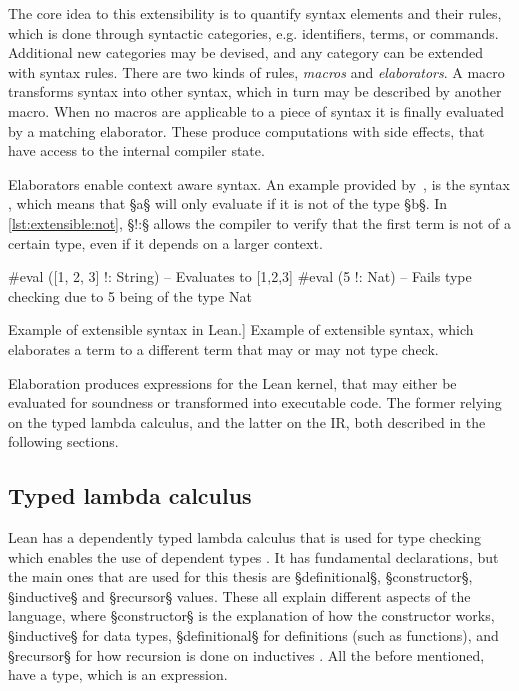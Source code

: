 The core idea to this extensibility is to quantify syntax elements and their rules, which is done through syntactic categories, e.g. identifiers, terms, or commands.
Additional new categories may be devised, and any category can be extended with syntax rules.
There are two kinds of rules, \textit{macros} and \textit{elaborators}.
A macro transforms syntax into other syntax, which in turn may be described by another macro.
When no macros are applicable to a piece of syntax it is finally evaluated by a matching elaborator.
These produce computations with side effects, that have access to the internal compiler state.

Elaborators enable context aware syntax.
An example provided by~\cite{Elaborators}, is the syntax , which means that §a§ will only evaluate if it is not of the type §b§.
In \cref{lst:extensible:not}, §!:§ allows the compiler to verify that the first term is not of a certain type, even if it depends on a larger context.

\begin{listing}[ht]
\begin{LeanCode}
#eval ([1, 2, 3] !: String) -- Evaluates to [1,2,3]
#eval (5 !: Nat) -- Fails type checking due to 5 being of the type Nat
\end{LeanCode}
\caption
  [Example of extensible syntax in Lean.]
  {Example of extensible syntax, which elaborates a term to a different term that may or may not type check.}
\label{lst:extensible:not}
\end{listing}

Elaboration produces expressions for the Lean kernel, that may either be evaluated for soundness or transformed into executable code.
The former relying on the typed lambda calculus, and the latter on the IR, both described in the following sections.


\subsection{Typed lambda calculus}\label{sec:lean:typed-lambda-calculus}
Lean has a dependently typed lambda calculus that is used for type checking which enables the use of dependent types \autocite{Lean}.
It has fundamental declarations, but the main ones that are used for this thesis are §definitional§, §constructor§, §inductive§ and §recursor§ values.
These all explain different aspects of the language, where §constructor§ is the explanation of how the constructor works, §inductive§ for data types, §definitional§ for definitions (such as functions), and §recursor§ for how recursion is done on inductives \autocite{Declaration}.
All the before mentioned, have a type, which is an expression.

